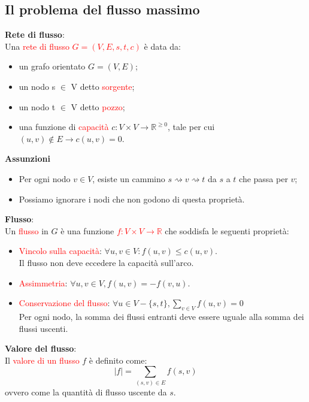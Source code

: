\documentclass[../cheatSheetAlgoritmi.tex]{subfiles}
\begin{document}
\subsection{Il problema del flusso massimo}
\textbf{Rete di flusso}:\\
Una \textcolor{red}{rete di flusso $G = (V, E, s, t, c)$} è data da:
\begin{itemize}
	\item un grafo orientato $G = (V, E)$;
	\item un nodo s $\in$ V detto \textcolor{red}{sorgente};
	\item un nodo t $\in$ V detto \textcolor{red}{pozzo};
	\item una funzione di \textcolor{red}{capacità} $c : V \times V \rightarrow \mathbb{R}^{\geq 0}$, tale per cui $(u, v) \notin E \rightarrow c(u, v) = 0$.
\end{itemize}
\textbf{Assunzioni}
\begin{itemize}
	\item Per ogni nodo $v \in V$, esiste un cammino $s \rightsquigarrow v \rightsquigarrow t$ da $s$ a $t$ che passa per $v$;
	\item Possiamo ignorare i nodi che non godono di questa proprietà.
\end{itemize}
\textbf{Flusso}: \\
Un \textcolor{red}{flusso} in $G$ è una funzione \textcolor{red}{$f: V \times V \rightarrow \mathbb{R}$} che soddisfa le seguenti proprietà:
\begin{itemize}
	\item \textcolor{red}{Vincolo sulla capacità}: $\forall u, v \in V : f(u, v) \leq c(u,v)$.\\ Il flusso non deve eccedere la capacità sull'arco.
	\item \textcolor{red}{Assimmetria}: $\forall u, v \in V, f(u,v) = - f(v, u)$. 
	\item \textcolor{red}{Conservazione del flusso}: $\forall u \in V - \{s, t\}, \sum_{v \in V} f(u, v) = 0$ 	\\
	Per ogni nodo, la somma dei flussi entranti deve essere uguale alla somma dei flussi uscenti.
\end{itemize}
\textbf{Valore del flusso}:\\
Il \textcolor{red}{valore di un flusso} $f$ è definito come: 
\begin{equation*}
  	|f| = \sum_{(s, v) \in E} f(s, v)
\end{equation*}
ovvero come la quantità di flusso uscente da $s$.\\\\
\end{document}
